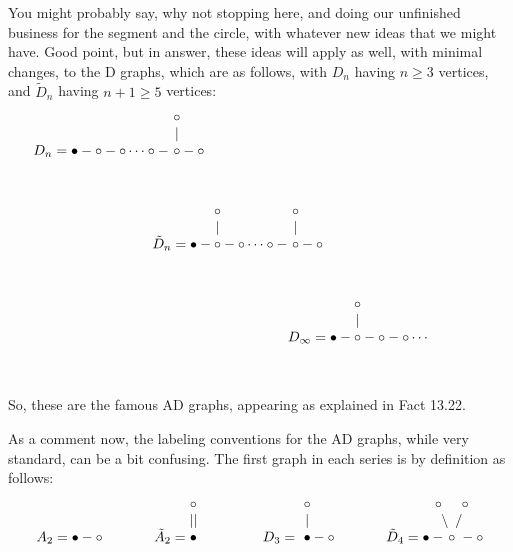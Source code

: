 \documentclass[12pt]{amsbook}
\begin{document}
You might probably say, why not stopping here, and doing our unfinished business for the segment and the circle, with whatever new ideas that we might have. Good point, but in answer, these ideas will apply as well, with minimal changes, to the D graphs, which are as follows, with $D_n$ having $n\geq3$ vertices, and $\tilde{D}_n$ having $n+1\geq5$ vertices:
$$D_n=\bullet-\circ-\circ\dots\circ-
\begin{matrix}\ \circ\\
\ |\\
\ \circ \\
\ \\
\  \end{matrix}-\circ\hskip71mm$$
\vskip-7mm
$$\hskip7mm\tilde{D}_n=\bullet-
\begin{matrix}\circ\\
|\\
\circ\\
\ \\
\ \end{matrix}-\circ\dots\circ-
\begin{matrix}\ \circ\\
\ |\\
\ \circ \\
\ \\
\  \end{matrix}-\circ\hskip18mm$$
\vskip-7mm
$$\hskip50mm D_\infty=\bullet-
\begin{matrix}\circ\\
|\\
\circ\\
\ \\
\ \end{matrix}-\circ-\circ\cdots$$
\vskip-7mm

So, these are the famous AD graphs, appearing as explained in Fact 13.22.

\bigskip

As a comment now, the labeling conventions for the AD graphs, while very standard, can be a bit confusing. The first graph in each series is by definition as follows:
$$A_2=\bullet-\circ\hskip13mm 
\tilde{A}_2=\begin{matrix}
\circ\\
||\\
\bullet\\
&\\
&\\
\end{matrix}\hskip13mm 
D_3=\begin{matrix}\ \circ\\
\ |\\
\ \bullet \\
\ \\
\  \end{matrix}-\circ \hskip13mm
\tilde{D}_4=\bullet-\!\!\!\!\!\begin{matrix}
\circ\hskip5mm \circ\\
\backslash\ \,\slash\\
\circ\\
&\\
&\\
\end{matrix}\!\!\!\!\!\!\!\!\!\!-\circ$$
\vskip-7mm
\end{document}
